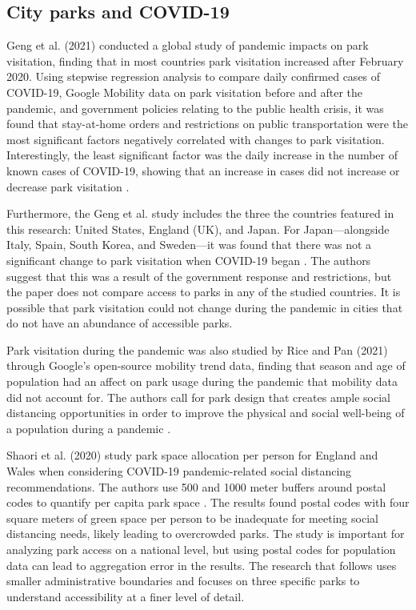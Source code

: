 \begin{multicols}{2}
\section{City parks and COVID-19}
Geng et al. (2021) conducted a global study of pandemic impacts on park visitation, finding that in most countries park visitation increased after February 2020. Using stepwise regression analysis to compare daily confirmed cases of COVID-19, Google Mobility data on park visitation before and after the pandemic, and government policies relating to the public health crisis, it was found that stay-at-home orders and restrictions on public transportation were the most significant factors negatively correlated with changes to park visitation. Interestingly, the least significant factor was the daily increase in the number of known cases of COVID-19, showing that an increase in cases did not increase or decrease park visitation \cite{geng_impacts_2021}. 

Furthermore, the Geng et al. study includes the three the countries featured in this research: United States, England (UK), and Japan. For Japan---alongside Italy, Spain, South Korea, and Sweden---it was found that there was not a significant change to park visitation when COVID-19 began \cite{geng_impacts_2021}. The authors suggest that this was a result of the government response and restrictions, but the paper does not compare access to parks in any of the studied countries. It is possible that park visitation could not change during the pandemic in cities that do not have an abundance of accessible parks. 

Park visitation during the pandemic was also studied by Rice and Pan (2021) through Google's open-source mobility trend data, finding that season and age of population had an affect on park usage during the pandemic that mobility data did not account for. The authors call for park design that creates ample social distancing opportunities in order to improve the physical and social well-being of a population during a pandemic \cite{rice_understanding_2021}.

Shaori et al. (2020) study park space allocation per person for England and Wales when considering COVID-19 pandemic-related social distancing recommendations. The authors use 500 and 1000 meter buffers around postal codes to quantify per capita park space \cite{shoari_accessibility_2020}. The results found postal codes with four square meters of green space per person to be inadequate for meeting social distancing needs, likely leading to overcrowded parks. The study is important for analyzing park access on a national level, but using postal codes for population data can lead to aggregation error in the results. The research that follows uses smaller administrative boundaries and focuses on three specific parks to understand accessibility at a finer level of detail. 


\end{multicols}
